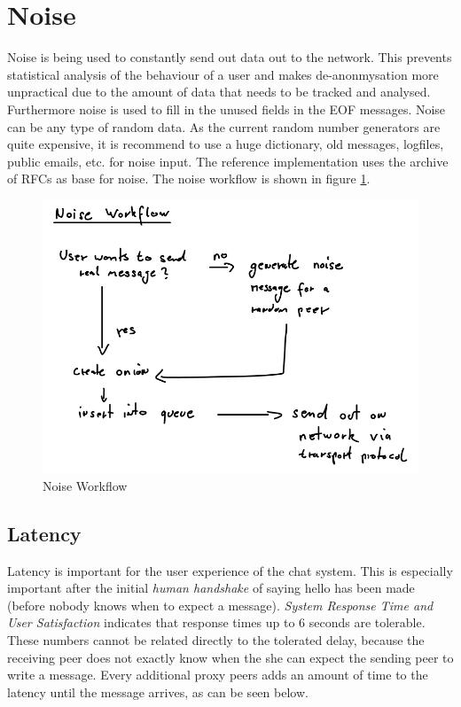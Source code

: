 \section{Noise}
\label{noise}
Noise is being used to constantly send out data out to the network.
This prevents statistical analysis of the behaviour of a user and makes
de-anonmysation more unpractical due to the amount of data that needs
to be tracked and analysed.
Furthermore noise is used to fill in the unused fields in the EOF messages.
Noise can be any type of random data. As the current random number generators
are quite expensive, it is recommend to use a huge dictionary, old 
messages, logfiles, public emails, etc. for noise input.
The reference implementation uses the archive of RFCs as base for noise.
The noise workflow is shown in figure \ref{noiseworkflow}.
\begin{figure}
    \centering
    \caption{Noise Workflow}
    \label{noiseworkflow}
    \includegraphics[scale=0.8]{noiseworkflow.png}
\end{figure}

\subsection{Latency}
\label{latency}
Latency is important for the user experience of the chat system.
This is especially important after the initial \textit{human handshake}
of saying hello has been made (before nobody knows when to expect
a message).
\textit{System Response Time and User Satisfaction}\cite{responsetime}
indicates that response times up to 6 seconds are tolerable. These numbers
cannot be related directly to the tolerated delay, because the receiving
peer does not exactly know when the she can expect the sending peer to write
a message.
Every additional proxy peers adds an amount of time to the latency until the
message arrives, as can be seen below.
